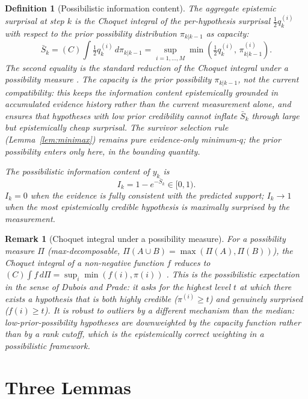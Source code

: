 \documentclass[12pt]{article}
\newtheorem{definition}[theorem]{Definition}
\newtheorem{remark}[theorem]{Remark}
\begin{document}
\begin{definition}[Possibilistic information content]
The aggregate epistemic surprisal at step $k$
is the Choquet integral of the per-hypothesis surprisal $\frac{1}{2}q^{(i)}_k$ with respect to the prior possibility
distribution $\pi_{k|k-1}$ as capacity:
\begin{equation}
\bar{S}_k = (C)\int \tfrac{1}{2}q^{(i)}_k\, d\pi_{k|k-1} = \sup_{i=1,\ldots,M} \min\!\left(\tfrac{1}{2}q^{(i)}_k,\, \pi^{(i)}_{k|k-1}\right).
\end{equation}
The second equality is the standard reduction of the Choquet integral under a possibility measure \cite{dubois}.
The capacity is the prior possibility $\pi_{k|k-1}$, not the current compatibility: this keeps the information
content epistemically grounded in accumulated evidence history rather than the current measurement
alone, and ensures that hypotheses with low prior credibility cannot inflate $\bar{S}_k$ through large but
epistemically cheap surprisal. The survivor selection rule (Lemma~\ref{lem:minimax}) remains pure evidence-only
minimum-$q$; the prior possibility enters only here, in the bounding quantity.

The possibilistic information content of $y_k$ is
\begin{equation}
I_k = 1 - e^{-\bar{S}_k} \in [0,1).
\end{equation}
$I_k = 0$ when the evidence is fully consistent with the predicted support; $I_k \to 1$ when the most
epistemically credible hypothesis is maximally surprised by the measurement.
\end{definition}

\begin{remark}[Choquet integral under a possibility measure]
For a possibility measure $\Pi$ (max-decomposable, $\Pi(A \cup B) = \max(\Pi(A),\Pi(B))$), the Choquet integral of a non-negative function $f$
reduces to $(C)\int f\, d\Pi = \sup_i \min(f(i), \pi(i))$ \cite{dubois}. This is the possibilistic expectation in the sense of
Dubois and Prade: it asks for the highest level $t$ at which there exists a hypothesis that is both
highly credible ($\pi^{(i)} \geq t$) and genuinely surprised ($f(i) \geq t$). It is robust to outliers by a different
mechanism than the median: low-prior-possibility hypotheses are downweighted by the capacity
function rather than by a rank cutoff, which is the epistemically correct weighting in a possibilistic
framework.
\end{remark}

\section{Three Lemmas}
\label{sec:lemmas}
\end{document}
